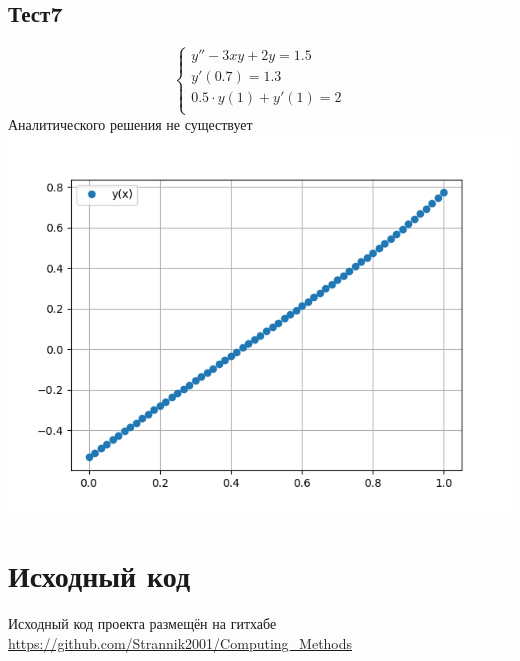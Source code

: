 \documentclass[a4paper,12pt,titlepage,finall]{article}
\begin{document}
\subsection{Тест7}
\begin{equation*}
 \begin{cases}
   y'' - 3xy + 2y = 1.5\\
   y'(0.7) = 1.3\\
   0.5 \cdot y(1) + y'(1) = 2\\
 \end{cases}
\end{equation*}
Аналитического решения не существует\\

\includegraphics[width=450pt]{Graphics/2.0.png}\newline
\newpage
\section{Исходный код} Исходный код проекта размещён на гитхабе \href{https://github.com/Strannik2001/Computing_Methods}{https://github.com/Strannik2001/Computing\_Methods}\\
\newpage
\end{document}
